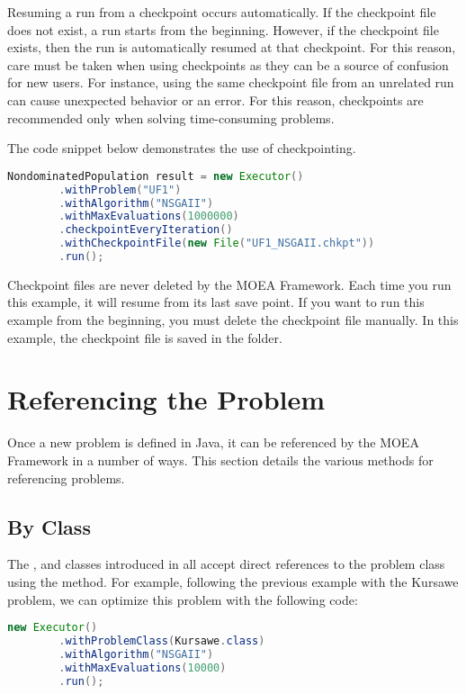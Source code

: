 Resuming a run from a checkpoint occurs automatically.  If the checkpoint file does not exist, a run starts from the beginning.  However, if the checkpoint file exists, then the run is automatically resumed at that checkpoint.  For this reason, care must be taken when using checkpoints as they can be a source of confusion for new users.  For instance, using the same checkpoint file from an unrelated run can cause unexpected behavior or an error.  For this reason, checkpoints are recommended only when solving time-consuming problems.

The code snippet below demonstrates the use of checkpointing.

\begin{lstlisting}[language=Java]
NondominatedPopulation result = new Executor()
		.withProblem("UF1")
		.withAlgorithm("NSGAII")
		.withMaxEvaluations(1000000)
		.checkpointEveryIteration()
		.withCheckpointFile(new File("UF1_NSGAII.chkpt"))
		.run();
\end{lstlisting}

\begin{important}
Checkpoint files are never deleted by the MOEA Framework.  Each time you run this example, it will resume from its last save point.  If you want to run this example from the beginning, you must delete the checkpoint file manually.  In this example, the checkpoint file is saved in the \folder{\moeaframework} folder.
\end{important}


\section{Referencing the Problem}
Once a new problem is defined in Java, it can be referenced by the MOEA Framework in a number of ways.  This section details the various methods for referencing problems.

\subsection{By Class}
The ,  and  classes introduced in  all accept direct references to the problem class using the  method.  For example, following the previous example with the Kursawe problem, we can optimize this problem with the following code:

\begin{lstlisting}[language=Java]
new Executor()
		.withProblemClass(Kursawe.class)
		.withAlgorithm("NSGAII")
		.withMaxEvaluations(10000)
		.run();
\end{lstlisting}

